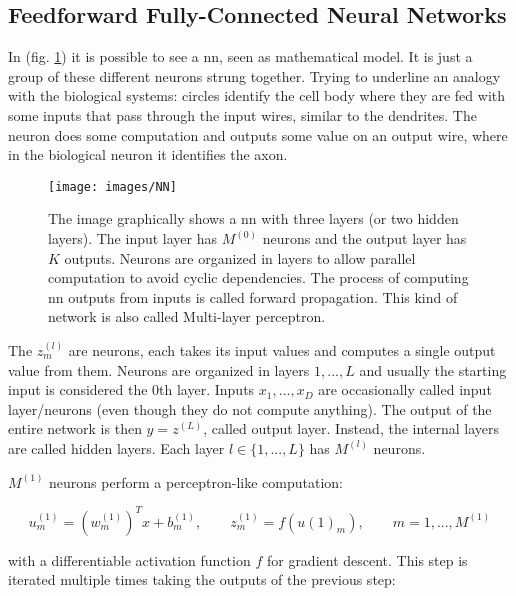 \subsection{Feedforward Fully-Connected Neural Networks}
\label{nn:feedforward}

\noindent In (fig. \ref{fig:nn}) it is possible to see a \gls{nn}, seen as mathematical model. It is just a group of these different neurons strung together. Trying to underline an analogy with the biological systems: circles identify the cell body where they are fed with some inputs that pass through the input wires, similar to the dendrites. The neuron does some computation and outputs some value on an output wire, where in the biological neuron it identifies the axon.

\begin{figure}[H]
	\centering
	\texttt{[image: images/NN]}
	\caption[Feed forward neural network.]{The image graphically shows a \gls{nn} with three layers (or two hidden layers). The input layer has $M^{(0)}$ neurons and the output layer has $K$ outputs. Neurons are organized in  layers to allow parallel computation to avoid cyclic dependencies. The process of computing \gls{nn} outputs from inputs is called forward propagation. This kind of network is also called Multi-layer perceptron.}
	\label{fig:nn}
\end{figure}

\noindent The $z^{(l)}_m$ are neurons, each takes its input values and computes a single output value from them. Neurons are organized in layers $1,...,L$ and usually the starting input is considered the 0th layer. Inputs $x_1,...,x_D$ are occasionally called input layer/neurons (even though they do not compute anything). The output of the entire network is then $y=z^{(L)}$, called output layer. Instead, the internal layers are called hidden layers. Each layer $l\in \{1,...,L\}$ has $M^{(l)}$ neurons.

\noindent $M^{(1)}$ neurons perform a perceptron-like computation:

\begin{Equation}[H]
	\centering
	\begin{equation} \label{eq:neurbas}
		u^{(1)}_m = (w^{(1)}_m)^T x + b^{(1)}_m,  
		\quad \quad
		z^{(1)}_m = f(u{(1)}_m),
		\quad \quad
		m=1,...,M^{(1)}
	\end{equation}	
\end{Equation}

\noindent with a differentiable activation function $f$ for gradient descent. This step is iterated multiple times taking the outputs of the previous step:


